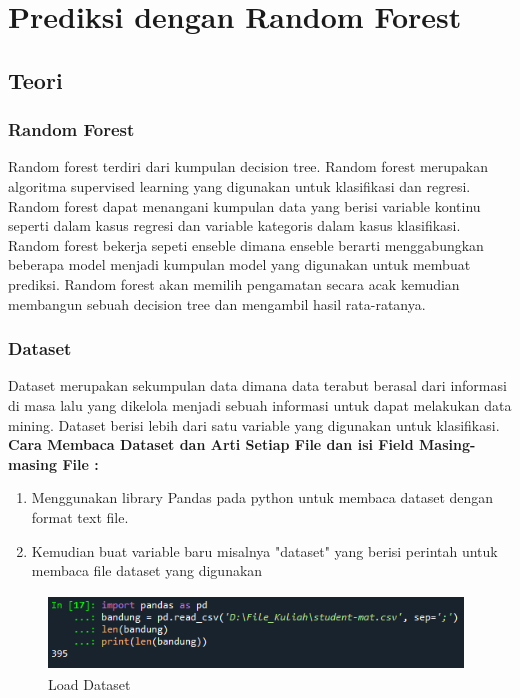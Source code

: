 \chapter{Prediksi dengan Random Forest}

\section{Teori}
\subsection{Random Forest}
Random forest terdiri dari kumpulan decision tree. Random forest merupakan algoritma supervised learning yang digunakan untuk klasifikasi dan regresi. Random forest dapat menangani kumpulan data yang berisi variable kontinu seperti dalam kasus regresi dan variable kategoris dalam kasus klasifikasi. Random forest bekerja sepeti enseble dimana enseble berarti menggabungkan beberapa model menjadi kumpulan model yang digunakan untuk membuat prediksi. Random forest akan memilih pengamatan secara acak kemudian membangun sebuah decision tree dan mengambil hasil rata-ratanya.

\subsection{Dataset}
Dataset merupakan sekumpulan data dimana data terabut berasal dari informasi di masa lalu yang dikelola menjadi sebuah informasi untuk dapat melakukan data mining. Dataset berisi lebih dari satu variable yang digunakan untuk klasifikasi.
\newline 
	\textbf {Cara Membaca Dataset dan Arti Setiap File dan isi Field Masing-masing File :}
    \begin{enumerate}
		\item Menggunakan library Pandas pada python untuk membaca dataset dengan format text file.
		\item Kemudian buat variable baru misalnya "dataset" yang berisi perintah untuk membaca file dataset yang digunakan
	\end{enumerate}
    \begin{figure}[!htbp]
        \centering
        \includegraphics[width=11cm,height=2cm]{figures/load_dataset.png}
        \caption{Load Dataset}
        \label{penanda}
    \end{figure}

